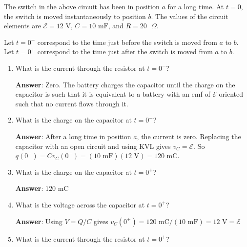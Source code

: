 \documentclass{article}
\begin{document}


The switch in the above circuit has been in position $a$ for a long time. At $t = 0$, the switch is moved instantaneously to position $b$. The values of the circuit elements are $\mathcal{E}= 12\text{ V}$, $C = 10\text{ mF}$, and $R = 20\text{ }\Omega$.

Let $t=0^-$ correspond to the time just before the switch is moved from $a$ to $b$. Let $t=0^+$ correspond to the time just after the switch is moved from $a$ to $b$.

\begin{enumerate}

  \item What is the current through the resistor at $t=0^-$?

        \ifsolutions
        \textbf{Answer}: Zero. The battery charges the capacitor until the charge on the capacitor is such that it is equivalent to a battery with an emf of $\mathcal{E}$ oriented such that no current flows through it.
        \else
        \vskip 56.25pt
        \fi
        \ifsolutions\else
        \vskip 56.25pt
        \fi

  \item What is the charge on the capacitor at $t=0^-$?

        \ifsolutions
        \textbf{Answer}: After a long time in position $a$, the current is zero. Replacing the capacitor with an open circuit and using KVL gives $v_C=\mathcal{E}$. So $q(0^-) = Cv_C(0^-) = (10 \text{ mF})(12\text{ V}) = 120\text{ mC}$.
        \else
        \vskip 56.25pt
        \fi
        \ifsolutions\else
        \vskip 56.25pt
        \fi

  \item What is the charge on the capacitor at $t=0^+$?

        \ifsolutions
        \textbf{Answer}: $120\text{ mC}$
        \else
        \vskip 56.25pt
        \fi
        \ifsolutions\else
        \vskip 56.25pt
        \fi

  \item What is the voltage across the capacitor at $t=0^+$?

        \ifsolutions
        \textbf{Answer}: Using $V=Q/C$ gives $v_C(0^+)=120\text{ mC}/(10\text{ mF}) = 12\text{ V} = \mathcal{E}$
        \else
        \vskip 56.25pt
        \fi
        \ifsolutions\else
        \vskip 56.25pt
        \fi

  \item What is the current through the resistor at $t=0^+$?


\end{enumerate}
\end{document}
